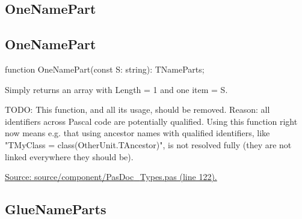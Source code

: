 \documentclass{report}
\newif\ifpdf
\begin{document}
\subsection*{\large{\textbf{OneNamePart}}\normalsize\hspace{1ex}\hrulefill}
\else
\subsection*{OneNamePart}
\fi
\label{PasDoc_Types-OneNamePart}
\begin{list}{}{
\setlength{\itemindent}{0cm}
\setlength{\listparindent}{0cm}
\setlength{\leftmargin}{\evensidemargin}
\addtolength{\leftmargin}{\tmplength}
\settowidth{\labelsep}{X}
\addtolength{\leftmargin}{\labelsep}
\setlength{\labelwidth}{\tmplength}
}
\item[\textbf{Declaration}\hfill]
\ifpdf
\begin{flushleft}
\fi
\begin{ttfamily}
function OneNamePart(const S: string): TNameParts;\end{ttfamily}

\ifpdf
\end{flushleft}
\fi

\par
\item[\textbf{Description}]
Simply returns an array with Length = 1 and one item = S.

TODO: This function, and all its usage, should be removed. Reason: all identifiers across Pascal code are potentially qualified. Using this function right now means e.g. that using ancestor names with qualified identifiers, like "TMyClass = class(OtherUnit.TAncestor)", is not resolved fully (they are not linked everywhere they should be).\par
\href{https://github.com/pasdoc/pasdoc/blob/master/source/component/PasDoc_Types.pas#L122}{Source: source/component/PasDoc{\_}Types.pas (line 122).}

\end{list}
\ifpdf
\subsection*{\large{\textbf{GlueNameParts}}\normalsize\hspace{1ex}\hrulefill}
\else
\end{document}
